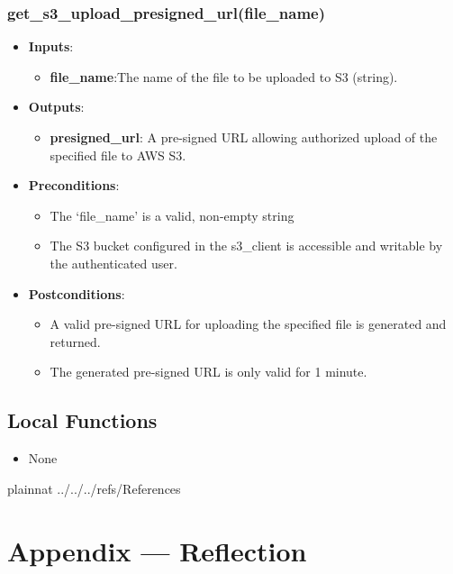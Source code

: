 \documentclass[12pt, titlepage]{article}
\begin{document}
\subsubsection{get\_s3\_upload\_presigned\_url(file\_name)}
\begin{itemize}
    \item \textbf{Inputs}:
        \begin{itemize}
            \item \textbf{file\_name}:The name of the file to be uploaded to S3 (string).
        \end{itemize}
        \item \textbf{Outputs}:
        \begin{itemize}
            \item \textbf{presigned\_url}: A pre-signed URL allowing authorized upload of the specified file to AWS S3.
        \end{itemize}
    \item \textbf{Preconditions}:
        \begin{itemize}
            \item The `file\_name' is a valid, non-empty string
            \item The S3 bucket configured in the s3\_client is accessible and writable by the authenticated user.
        \end{itemize}
    \item \textbf{Postconditions}:
        \begin{itemize}
            \item A valid pre-signed URL for uploading the specified file is generated and returned.
            \item The generated pre-signed URL is only valid for 1 minute.
        \end{itemize}
\end{itemize}


\subsection{Local Functions}
\begin{itemize}
    \item None
\end{itemize}


 {plainnat}
 {../../../refs/References}

\newpage


\section*{Appendix --- Reflection}
\end{document}
